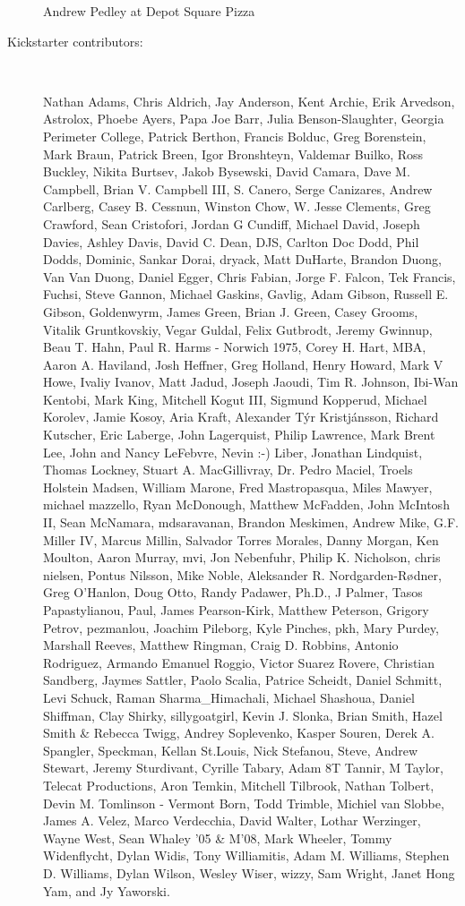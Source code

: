\documentclass[11pt,final]{book}
\begin{document}
\begin{description}
Andrew Pedley at Depot Square Pizza

 \item[Kickstarter contributors:] ~  
 
Nathan Adams,
Chris Aldrich,
Jay Anderson,
Kent Archie,
Erik Arvedson,
Astrolox,
Phoebe Ayers,
Papa Joe Barr,
Julia Benson-Slaughter, Georgia Perimeter College,
Patrick Berthon,
Francis Bolduc,
Greg Borenstein,
Mark Braun,
Patrick Breen,
Igor Bronshteyn,
Valdemar Buil\-ko,
Ross Buckley,
Nikita Burtsev,
Jakob Bysewski,
David Camara,
Dave M. Campbell,
Brian V. Campbell III,
S. Canero,
Serge Canizares,
Andrew Carlberg,
Casey B. Cessnun,
Winston Chow,
W. Jesse Clements,
Greg Crawford,
Sean Cristofori,
Jordan G Cundiff,
Michael David,
Joseph Davies,
Ashley Davis,
David C. Dean,
DJS,
Carlton Doc Dodd,
Phil Dodds,
Dominic,
Sankar Dorai,
dryack,
Matt DuHarte,
Brandon Duong,
Van Van Duong,
Daniel Egger,
Chris Fabian,
Jorge F. Falcon,
Tek Francis,
Fuchsi,
Steve Gannon,
Michael Gaskins,
Gavlig,
Adam Gibson,
Russell E. Gibson,
Goldenwyrm,
James Green,
Brian J. Green,
Casey Grooms,
Vitalik Gruntkovskiy,
Vegar Guldal,
Felix Gutbrodt,
Jeremy Gwinnup,
Beau T. Hahn,
Paul R. Harms - Norwich 1975,
Corey H. Hart, MBA,
Aaron A. Haviland,
Josh Heffner,
Greg Holland,
Henry Howard,
Mark V Howe,
Ivaliy Ivanov,
Matt Jadud,
Joseph Jaoudi,
Tim R. Johnson,
Ibi-Wan Kentobi,
Mark King,
Mitchell Kogut III,
Sigmund Kopperud,
Michael Korolev,
Jamie Kosoy,
Aria Kraft,
Alexander T{\'{y}}r Kristj{\'{a}}nsson,
Richard Kutscher,
Eric Laberge,
John Lagerquist,
Philip Lawrence,
Mark Brent Lee,
John and Nancy LeFebvre,
Nevin :-) Liber,
Jonathan Lindquist,
Thomas Lockney,
Stuart A. MacGillivray,
Dr. Pedro Maciel,
Troels Holstein Madsen,
William Marone,
Fred Mastropasqua,
Miles Mawyer,
michael mazzello,
Ryan McDonough,
Matthew McFadden,
John McIntosh II,
Sean McNamara,
mdsaravanan,
Brandon Meskimen,
Andrew Mike,
G.F. Miller IV,
Marcus Millin,
Salvador Torres Morales,
Danny Morgan,
Ken Moulton,
Aaron Murray,
mvi,
Jon Nebenfuhr,
Philip K. Nicholson,
chris nielsen,
Pontus Nilsson,
Mike Noble,
Aleksander R. Nord\-gar\-den-R{\o}d\-ner,
Greg O'Han\-lon,
Doug Otto,
Randy Padawer, Ph.D.,
J Palmer,
Tasos Papastylianou,
Paul,
James Pearson-Kirk,
Matthew Peterson,
Grigory Petrov,
pezmanlou,
Joachim Pileborg,
Kyle Pinches,
pkh,
Mary Purdey,
Marshall Reeves,
Matthew Ringman,
Craig D. Robbins,
Antonio Rodriguez,
Armando Emanuel Roggio,
Victor Suarez Rovere,
Christian Sandberg,
Jaymes Sattler,
Paolo Scalia,
Patrice Scheidt,
Daniel Schmitt,
Levi Schuck,
Raman Sharma\_Himachali,
Michael Shashoua,
Daniel Shiffman,
Clay Shirky,
sillygoatgirl,
Kevin J. Slonka,
Brian Smith,
Hazel Smith \& Rebecca Twigg,
Andrey Soplevenko,
Kasper Souren,
Derek A. Spangler,
Speckman,
Kellan St.Louis,
Nick Stefanou,
Steve,
Andrew Stewart,
Jeremy Sturdivant,
Cyrille Tabary,
Adam 8T Tannir,
M Taylor,
Telecat Productions,
Aron Temkin,
Mitchell Tilbrook,
Nathan Tolbert,
Devin M. Tomlinson - Vermont Born,
Todd Trimble,
Michiel van Slobbe,
James A. Velez,
Marco Verdecchia,
David Walter,
Lothar Werzinger,
Wayne West,
Sean Whaley '05 \& M'08,
Mark Wheeler,
Tommy Widenflycht,
Dylan Widis,
Tony Williamitis,
Adam M. Williams,
Stephen D. Williams,
Dylan Wilson,
Wesley Wiser,
wizzy,
Sam Wright,
Janet Hong Yam,
and
Jy Yaworski.



\end{description}
\end{document}
